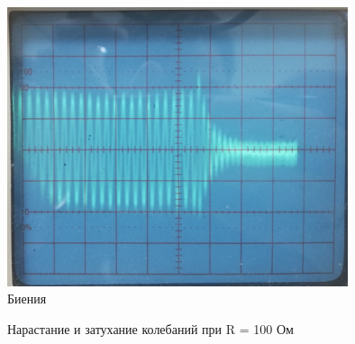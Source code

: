 \documentclass[a4paper, fontsize = 14pt]{article}
\begin{document}
\begin{figure}
    \centering
    \includegraphics[width=10cm]{1.jpg}
    \caption{Биения}
    \label{fig:1}
\end{figure}
\begin{figure}[h]
   
\begin{minipage}[h]{0.49\linewidth}
\end{minipage}
\begin{minipage}[h]{0.49\linewidth}
\end{minipage}
\label{fig:2}
\caption{Нарастание и затухание колебаний при R = 100 Ом}
\end{figure}
\end{document}
